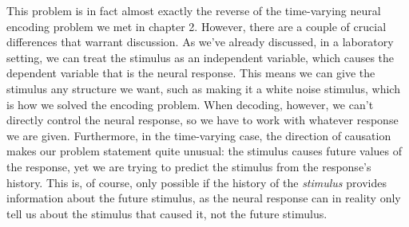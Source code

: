 \documentclass{article}
\begin{document}
\begin{figure}[H]
	\centering

\end{figure}

This problem is in fact almost exactly the reverse of the time-varying neural encoding problem we met in chapter 2. However, there are a couple of crucial differences that warrant discussion. As we've already discussed, in a laboratory setting, we can treat the stimulus as an independent variable, which causes the dependent variable that is the neural response. This means we can give the stimulus any structure we want, such as making it a white noise stimulus, which is how we solved the encoding problem. When decoding, however, we can't directly control the neural response, so we have to work with whatever response we are given. Furthermore, in the time-varying case, the direction of causation makes our problem statement quite unusual: the stimulus causes future values of the response, yet we are trying to predict the stimulus from the response's history. This is, of course, only possible if the history of the \textit{stimulus} provides information about the future stimulus, as the neural response can in reality only tell us about the stimulus that caused it, not the future stimulus.\\
\end{document}
